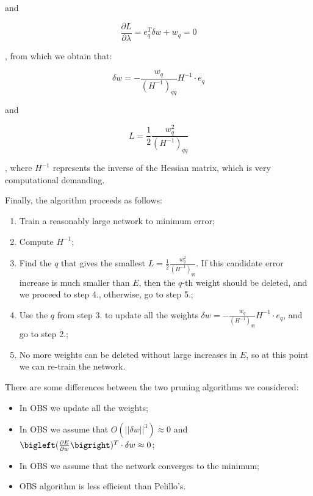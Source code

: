 and

$$
\frac{\partial L}{\partial \lambda} = e_q^T \delta w + w_q = 0
$$

, from which we obtain that:

$$
\delta w = - \frac{w_q}{(H^{-1})_{qq}} H^{-1} \cdot e_q
$$

and 

$$
L = \frac{1}{2} \frac{w_q^2}{(H^{-1})_{qq}}
$$

, where $H^{-1}$ represents the inverse of the Hessian matrix, which is very computational demanding.

Finally, the algorithm proceeds as follows:

\begin{enumerate}
    \item Train a reasonably large network to minimum error;
    \item Compute $H^{-1}$;
    \item Find the $q$ that gives the smallest $L = \frac{1}{2} \frac{w_q^2}{(H^{-1})_{qq}}$. If this candidate error increase is much smaller than $E$, then the $q$-th weight should be deleted, and we proceed to step 4., otherwise, go to step 5.;
    \item Use the $q$ from step 3. to update all the weights $\delta w = - \frac{w_q}{(H^{-1})_{qq}} H^{-1} \cdot e_q$, and go to step 2.;
    \item No more weights can be deleted without large increases in $E$, so at this point we can re-train the network.
\end{enumerate}

There are some differences between the two pruning algorithms we considered:

\begin{itemize}
    \item In OBS we update all the weights;
    \item In OBS we assume that $O(||\delta w||^3) \approx 0$ and $\bigleft( \frac{\partial E}{\partial w} \bigright)^T \cdot \delta w \approx 0$;
    \item In OBS we assume that the network converges to the minimum;
    \item OBS algorithm is less efficient than Pelillo's.
\end{itemize}

